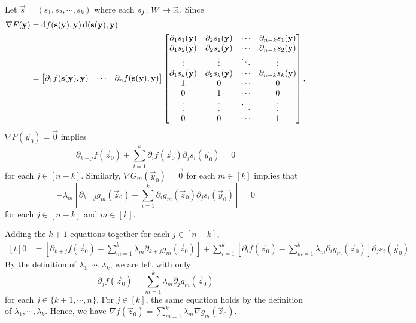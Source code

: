 \documentclass[../MAS242_Note.tex]{subfiles}
\begin{document}
{    Let \(\vec{s} = (s_1, s_2, \cdots, s_k)\) where each \(s_j \colon W \to \RR\).
    Since
    \[\begin{aligned}[t]
        \nabla F(\mathbf{y}) &= \mathrm{d}f(\mathbf{s}(\mathbf{y}), \mathbf{y})\,\mathrm{d}(\mathbf{s}(\mathbf{y}), \mathbf{y}) \\
        &= \begin{bmatrix}
            \partial_1 f(\mathbf{s}(\mathbf{y}), \mathbf{y}) & \cdots & \partial_n f(\mathbf{s}(\mathbf{y}), \mathbf{y})
        \end{bmatrix} \begin{bmatrix}
            \partial_1 s_1(\mathbf{y}) & \partial_2 s_1(\mathbf{y}) & \cdots & \partial_{n-k} s_1(\mathbf{y}) \\
            \partial_1 s_2(\mathbf{y}) & \partial_2 s_2(\mathbf{y}) & \cdots & \partial_{n-k} s_2(\mathbf{y}) \\
            \vdots & \vdots & \ddots & \vdots \\
            \partial_1 s_{k}(\mathbf{y}) & \partial_2 s_{k}(\mathbf{y}) & \cdots & \partial_{n-k} s_{k}(\mathbf{y}) \\
            1 & 0 & \cdots & 0 \\
            0 & 1 & \cdots & 0 \\
            \vdots & \vdots & \ddots & \vdots \\
            0 & 0 & \cdots & 1
        \end{bmatrix},
    \end{aligned}\]
    \(\nabla F(\vec{y}_0) = \vec{0}\) implies
    \[
        \partial_{k+j} f(\vec{z}_0)
        + \sum_{i=1}^{k} \partial_i f(\vec{z}_0) \partial_j s_i(\vec{y}_0) = 0
    \]
    for each \(j \in [n-k]\).
    Similarly, \(\nabla G_m(\vec{y}_0) = \vec{0}\) for each \(m \in [k]\) implies that
    \[
        -\lambda_m \left[ \partial_{k+j} g_m(\vec{z}_0)
        + \sum_{i=1}^{k} \partial_i g_m(\vec{z}_0) \partial_j s_i(\vec{y}_0)\right] = 0
    \]
    for each \(j \in [n - k]\) and \(m \in [k]\).

    Adding the \(k + 1\) equations together for each \(j \in [n - k]\),
    \[\begin{aligned}[t]
        0 &= \left[ \partial_{k+j} f(\vec{z}_0) - \sum_{m=1}^{k} \lambda_m \partial_{k+j} g_m(\vec{z}_0) \right]
        + \sum_{i=1}^{k} \left[
            \partial_i f(\vec{z}_0)
            - \sum_{m=1}^{k} \lambda_m \partial_i g_m(\vec{z}_0)
        \right] \partial_j s_i(\vec{y}_0).
    \end{aligned}\]
    By the definition of \(\lambda_1, \cdots, \lambda_k\),
    we are left with only
    \[
        \partial_{j} f(\vec{z}_0) = \sum_{m=1}^{k} \lambda_m \partial_{j} g_m(\vec{z}_0)
    \]
    for each \(j \in \{k+1, \cdots, n\}\).
    For \(j \in [k]\), the same equation holds by the definition of \(\lambda_1, \cdots, \lambda_k\).
    Hence, we have \(\nabla f(\vec{z}_0) = \sum_{m=1}^{k} \lambda_m \nabla g_m(\vec{z}_0)\).
}
\end{document}
